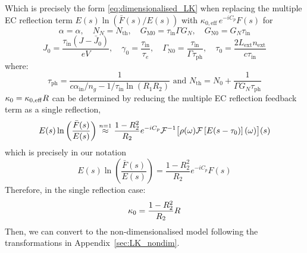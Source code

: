%
Which is precisely the form \eqref{eq:dimensionalised_LK} when replacing the multiple EC reflection term $E(s) \ln \left( \bar{F}(s) / E(s) \right)$ with $\kappa_{0,\mathrm{eff}} \, e^{-i C_p} F(s)$ for
%
\[ \alpha = \alpha , \quad N_N = N_{\text{th}}, \quad G_\text{M0} = \tau_\text{in} \Gamma G_N, \quad G_\text{N0} = G_N \tau_\text{in} 
\]
\[
J_0 = \frac{\tau_\text{in}(J-\bar{J}_0)}{e V}, \quad \gamma_0 = \frac{\tau_\text{in}}{\tau_e}, \quad \Gamma_\text{N0} = \frac{\tau_\text{in}}{\Gamma \tau_\text{ph}}, \quad \tau_0 = \frac{2 L_\text{ext} n_\text{ext}}{c \tau_\text{in}} 
\]
%
where:
%
\begin{equation*}
\tau_\text{ph}=\frac{1}{c \alpha_\text{in} / n_g - 1 / \tau_\text{in} \ln \left(R_1 R_2\right)} \text{ and } N_{\text{th}} = N_0+\frac{1}{\Gamma G_N \tau_\text{ph}} 
\end{equation*}
%
$\kappa_0 = \kappa_{0,\mathrm{eff}} R$ can be determined by reducing the multiple EC reflection feedback term as a single reflection,
%
\begin{equation*}
E(s) \ln \left( \frac{\bar{F}(s)}{E(s)} \right) \overset{n=1}{\approx} \frac{1-R_2^2}{R_2}e^{-iC_p} \mathcal{F}^{-1}\big[ \rho(\omega) \mathcal{F}\left[ E(s-\tau_0) \right](\omega) \big](s)
\end{equation*}
%
which is precisely in our notation
%
\begin{equation*}
E(s) \ln \left(\frac{\bar{F}(s)}{E(s)}\right)=\frac{1-R_2^2}{R_2} e^{-i C_p} F(s)
\end{equation*}
%
Therefore, in the single reflection case:
%
\begin{equation*}
    \kappa_0=\frac{1-R_2^2}{R_2} R
\end{equation*}
%
Then, we can convert to the non-dimensionalised model following the transformations in Appendix~\ref{sec:LK_nondim}.
%
%
